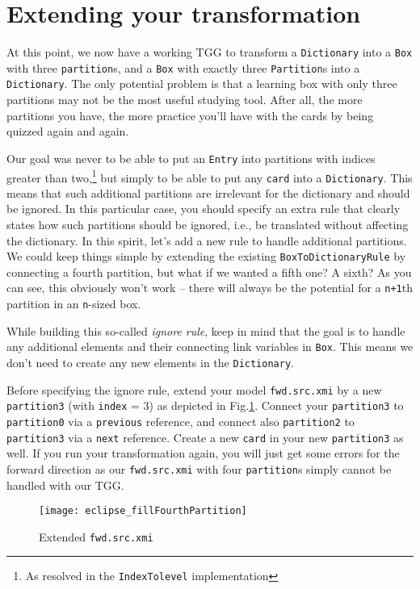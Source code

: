 \newpage
\section{Extending your transformation}
\genHeader

At this point, we now have a working TGG to transform a \texttt{Dictionary} into a \texttt{Box} with three \texttt{partition}s, and a \texttt{Box} with
exactly three \texttt{Partition}s into a \texttt{Dictionary}. The only potential problem is that a learning box with only three partitions may not be the most
useful studying tool. After all, the more partitions you have, the more practice you'll have with the cards by being quizzed again and again.

Our goal was never to be able to put an \texttt{Entry} into
partitions with indices greater than two,\footnote{As resolved in the \texttt{IndexTolevel} implementation} but simply to be able to put any \texttt{card} into
a \texttt{Dictionary}. This means that such additional partitions are irrelevant for the dictionary and should be ignored. 
In this particular case, you should specify
an extra rule that clearly states how such partitions should be ignored, i.e., be translated without affecting the dictionary. In this spirit, let's add a new
rule to handle additional partitions. We could keep things simple by extending the existing \texttt{BoxToDictionaryRule} by connecting a fourth partition, but
what if we wanted a fifth one? A sixth? As you can see, this obviously won't work -- there will always be the potential for a \texttt{n+1}th partition in an \texttt{n}-sized box. 

While building this so-called \emph{ignore rule}, keep in mind that the goal is to handle any additional elements and their connecting link variables in \texttt{Box}.
This means we don't need to create any new elements in the \texttt{Dictionary}.

Before specifying the ignore rule, extend your model \texttt{fwd.src.xmi} by a new \texttt{partition3} (with \texttt{index} = 3) as depicted in Fig.\ref{fig:ea_extended_fwd_src_xmi}.
Connect your \texttt{partition3}  to \texttt{partition0} via a \texttt{previous} reference, and connect also \texttt{partition2} to \texttt{partition3} via a \texttt{next} reference.
Create a new \texttt{card} in your new \texttt{partition3} as well.
If you run your transformation again, you will just get some errors for the forward direction as our \texttt{fwd.src.xmi} with four \texttt{partition}s simply cannot be handled with our TGG.

\begin{figure}[htbp]
\begin{center}
  \texttt{[image: eclipse\_fillFourthPartition]}
  \caption{Extended \texttt{fwd.src.xmi}}
  \label{fig:ea_extended_fwd_src_xmi}
\end{center}
\end{figure}





